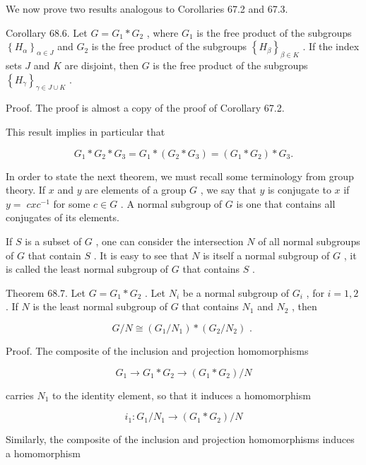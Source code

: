 \documentclass[10pt]{article}
\begin{document}
We now prove two results analogous to Corollaries 67.2 and 67.3.

Corollary 68.6. Let \(G = {G}_{1} * {G}_{2}\) , where \({G}_{1}\) is the free product of the subgroups \({\left\{  {H}_{\alpha }\right\}  }_{\alpha  \in  J}\) and \({G}_{2}\) is the free product of the subgroups \({\left\{  {H}_{\beta }\right\}  }_{\beta  \in  K}\) . If the index sets \(J\) and \(K\) are disjoint, then \(G\) is the free product of the subgroups \({\left\{  {H}_{\gamma }\right\}  }_{\gamma  \in  J \cup  K}\) .

Proof. The proof is almost a copy of the proof of Corollary 67.2.

This result implies in particular that

\[
{G}_{1} * {G}_{2} * {G}_{3} = {G}_{1} * \left( {{G}_{2} * {G}_{3}}\right)  = \left( {{G}_{1} * {G}_{2}}\right)  * {G}_{3}.
\]

In order to state the next theorem, we must recall some terminology from group theory. If \(x\) and \(y\) are elements of a group \(G\) , we say that \(y\) is conjugate to \(x\) if \(y = \; {cx}{c}^{-1}\) for some \(c \in  G\) . A normal subgroup of \(G\) is one that contains all conjugates of its elements.

If \(S\) is a subset of \(G\) , one can consider the intersection \(N\) of all normal subgroups of \(G\) that contain \(S\) . It is easy to see that \(N\) is itself a normal subgroup of \(G\) , it is called the least normal subgroup of \(G\) that contains \(S\) .

Theorem 68.7. Let \(G = {G}_{1} * {G}_{2}\) . Let \({N}_{i}\) be a normal subgroup of \({G}_{i}\) , for \(i = 1,2\) . If \(N\) is the least normal subgroup of \(G\) that contains \({N}_{1}\) and \({N}_{2}\) , then

\[
G/N \cong  \left( {{G}_{1}/{N}_{1}}\right)  * \left( {{G}_{2}/{N}_{2}}\right) \text{ . }
\]

Proof. The composite of the inclusion and projection homomorphisms

\[
{G}_{1} \rightarrow  {G}_{1} * {G}_{2} \rightarrow  \left( {{G}_{1} * {G}_{2}}\right) /N
\]

carries \({N}_{1}\) to the identity element, so that it induces a homomorphism

\[
{i}_{1} : {G}_{1}/{N}_{1} \rightarrow  \left( {{G}_{1} * {G}_{2}}\right) /N
\]

Similarly, the composite of the inclusion and projection homomorphisms induces a homomorphism
\end{document}
